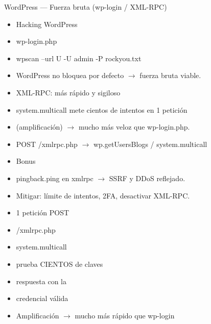 \documentclass[aspectratio=169,10pt]{beamer}
\begin{document}
\begin{frame}[allowframebreaks]{WordPress --- Fuerza bruta (wp-login / XML-RPC)}
\small
  \begin{itemize}
  \item Hacking WordPress
  \item wp-login.php
  \item wpscan --url U -U admin -P rockyou.txt
  \item WordPress no bloquea por defecto $\rightarrow$ fuerza bruta viable.
  \item XML-RPC: más rápido y sigiloso
  \item system.multicall mete cientos de intentos en 1 petición
  \item (amplificación) $\rightarrow$ mucho más veloz que wp-login.php.
  \item POST /xmlrpc.php $\rightarrow$ wp.getUsersBlogs / system.multicall
  \item Bonus
  \item pingback.ping en xmlrpc $\rightarrow$ SSRF y DDoS reflejado.
  \item Mitigar: límite de intentos, 2FA, desactivar XML-RPC.
  \item 1 petición POST
  \item /xmlrpc.php
  \item system.multicall
  \item prueba CIENTOS de claves
  \item respuesta con la
  \item credencial válida
  \item Amplificación $\rightarrow$ mucho más rápido que wp-login
  \end{itemize}
\end{frame}
\end{document}
